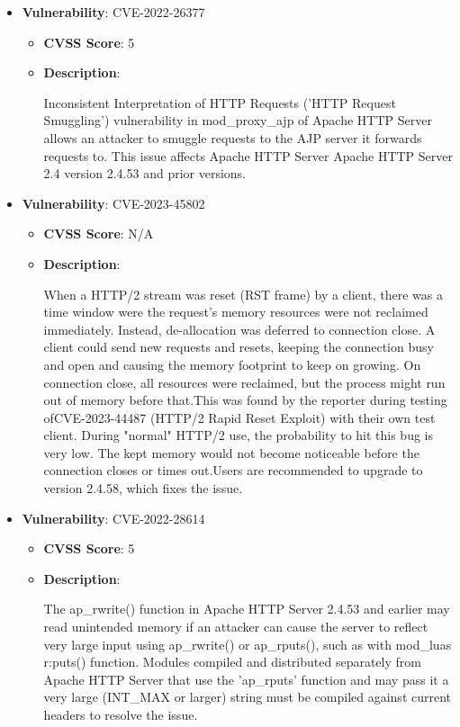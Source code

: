 \documentclass{article}
\begin{document}
\begin{itemize}
        \item \textbf{Vulnerability}: CVE-2022-26377
        \begin{itemize}
            \item \textbf{CVSS Score}:  5 
            \item \textbf{Description}:
            \parbox[t]{0.9\linewidth}{
                \ttfamily Inconsistent Interpretation of HTTP Requests ('HTTP Request Smuggling') vulnerability in mod\_proxy\_ajp of Apache HTTP Server allows an attacker to smuggle requests to the AJP server it forwards requests to. This issue affects Apache HTTP Server Apache HTTP Server 2.4 version 2.4.53 and prior versions.
            }
        \end{itemize}
    
        \item \textbf{Vulnerability}: CVE-2023-45802
        \begin{itemize}
            \item \textbf{CVSS Score}:  N/A 
            \item \textbf{Description}:
            \parbox[t]{0.9\linewidth}{
                \ttfamily When a HTTP/2 stream was reset (RST frame) by a client, there was a time window were the request's memory resources were not reclaimed immediately. Instead, de-allocation was deferred to connection close. A client could send new requests and resets, keeping the connection busy and open and causing the memory footprint to keep on growing. On connection close, all resources were reclaimed, but the process might run out of memory before that.This was found by the reporter during testing ofCVE-2023-44487 (HTTP/2 Rapid Reset Exploit) with their own test client. During "normal" HTTP/2 use, the probability to hit this bug is very low. The kept memory would not become noticeable before the connection closes or times out.Users are recommended to upgrade to version 2.4.58, which fixes the issue.
            }
        \end{itemize}
    
        \item \textbf{Vulnerability}: CVE-2022-28614
        \begin{itemize}
            \item \textbf{CVSS Score}:  5 
            \item \textbf{Description}:
            \parbox[t]{0.9\linewidth}{
                \ttfamily The ap\_rwrite() function in Apache HTTP Server 2.4.53 and earlier may read unintended memory if an attacker can cause the server to reflect very large input using ap\_rwrite() or ap\_rputs(), such as with mod\_luas r:puts() function. Modules compiled and distributed separately from Apache HTTP Server that use the 'ap\_rputs' function and may pass it a very large (INT\_MAX or larger) string must be compiled against current headers to resolve the issue.
            }
        \end{itemize}
    

\end{itemize}
\end{document}
